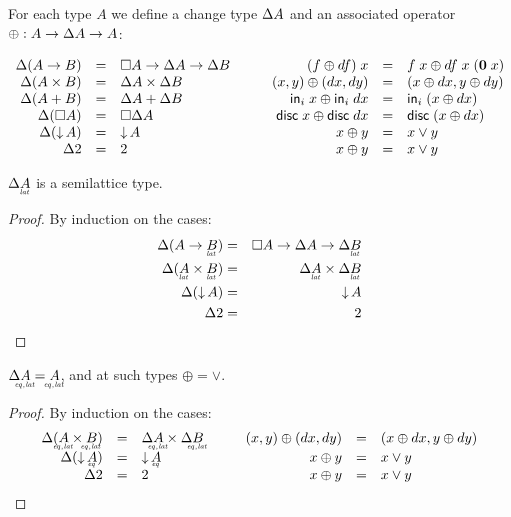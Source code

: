 \documentclass{article}
\begin{document}
For each type $A$ we define a change type $\Delta A$ and an associated operator
$\oplus : A \to \Delta A \to A$:

\[\begin{array}{rcl>{\quad\quad}rcl}
  \GD(A \to B) &=& \Disc{A} \to \Delta A \to \Delta B
  & (f \oplus df)\; x &=& f\; x \oplus df\; x\; (\mb{0}\; x)\\
  \GD(A \x B) &=& \GD A \x \GD B
  & (x,y) \oplus (dx,dy) &=& (x \oplus dx, y \oplus dy)\\
  \GD(A + B) &=& \GD A + \GD B
  & \inj{i}{x} \oplus \inj{i}{dx} &=& \inj{i}{(x \oplus dx)}\\
  \GD(\Disc{A}) &=& \Disc{\GD A}
  & \disc{x} \oplus \disc{dx} &=& \disc{(x \oplus dx)}\\
  \GD(\Down{A}) &=& \Down{A} & x \oplus y &=& x \vee y\\
  \GD 2 &=& 2 & x \oplus y &=& x \vee y
\end{array}\]



\begin{lemma}
  $\GD \lat{A}$ is a semilattice type.
\end{lemma}
\begin{proof}
  By induction on the cases:
  \begin{eqnarray*}
    \GD(A \to \lat{B}) &=& \Disc{A} \to \GD A \to \GD \lat{B}\\
    \GD(\lat{A} \x \lat{B}) &=& \GD \lat{A} \x \GD \lat{B}\\
    \GD(\Down{A}) &=& \Down{A}\\
    \GD 2 &=& 2
  \end{eqnarray*}
\end{proof}

\begin{lemma}
  $\GD \eqlat{A} = \eqlat{A}$, and at such types $\oplus = \vee$.
\end{lemma}
\begin{proof}
  By induction on the cases:
  \[\begin{array}{rclrcl}
    \GD(\eqlat{A} \x \eqlat{B}) &=& \GD \eqlat{A} \x \GD \eqlat{B}
    \quad&\quad (x,y) \oplus (dx,dy) &=& (x \oplus dx, y \oplus dy)
    \\
    \GD(\Down{\eq{A}}) &=& \Down{\eq{A}}
    \quad&\quad x \oplus y &=& x \vee y\\
    \GD 2 &=& 2
    \quad&\quad x \oplus y &=& x \vee y
  \end{array}\]
\end{proof}
\end{document}
